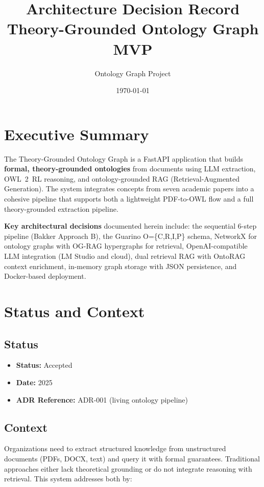\documentclass[11pt,a4paper]{article}
\title{\textbf{Architecture Decision Record}\\[0.5em]
Theory-Grounded Ontology Graph MVP}
\author{Ontology Graph Project}
\date{\today}
\begin{document}
\maketitle
\tableofcontents
\newpage

\section{Executive Summary}

The Theory-Grounded Ontology Graph is a FastAPI application that builds \textbf{formal, theory-grounded ontologies} from documents using LLM extraction, OWL~2~RL reasoning, and ontology-grounded RAG (Retrieval-Augmented Generation). The system integrates concepts from seven academic papers into a cohesive pipeline that supports both a lightweight PDF-to-OWL flow and a full theory-grounded extraction pipeline.

\textbf{Key architectural decisions} documented herein include: the sequential 6-step pipeline (Bakker Approach B), the Guarino O=\{C,R,I,P\} schema, NetworkX for ontology graphs with OG-RAG hypergraphs for retrieval, OpenAI-compatible LLM integration (LM Studio and cloud), dual retrieval RAG with OntoRAG context enrichment, in-memory graph storage with JSON persistence, and Docker-based deployment.

\section{Status and Context}

\subsection{Status}
\begin{itemize}[noitemsep]
    \item \textbf{Status:} Accepted
    \item \textbf{Date:} 2025
    \item \textbf{ADR Reference:} ADR-001 (living ontology pipeline)
\end{itemize}

\subsection{Context}
Organizations need to extract structured knowledge from unstructured documents (PDFs, DOCX, text) and query it with formal guarantees. Traditional approaches either lack theoretical grounding or do not integrate reasoning with retrieval. This system addresses both by:
\end{document}
